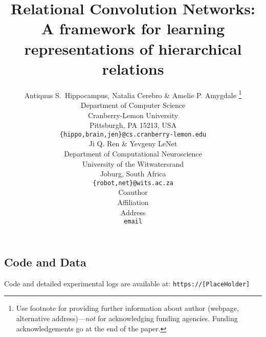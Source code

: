 \documentclass{article}
\title{Relational Convolution Networks: A framework for learning representations of hierarchical relations}
\author{Antiquus S.~Hippocampus, Natalia Cerebro \& Amelie P. Amygdale \thanks{ Use footnote for providing further information
about author (webpage, alternative address)---\emph{not} for acknowledging
funding agencies.  Funding acknowledgements go at the end of the paper.} \\
Department of Computer Science\\
Cranberry-Lemon University\\
Pittsburgh, PA 15213, USA \\
\texttt{\{hippo,brain,jen\}@cs.cranberry-lemon.edu} \\
\And
Ji Q. Ren \& Yevgeny LeNet \\
Department of Computational Neuroscience \\
University of the Witwatersrand \\
Joburg, South Africa \\
\texttt{\{robot,net\}@wits.ac.za} \\
\AND
Coauthor \\
Affiliation \\
Address \\
\texttt{email}
}
\begin{document}
\maketitle













% 



\subsection*{Code and Data}
Code and detailed experimental logs are available at: \texttt{https://[PlaceHolder]}

\medskip

\clearpage
{%



}

\clearpage
\appendix



\end{document}

